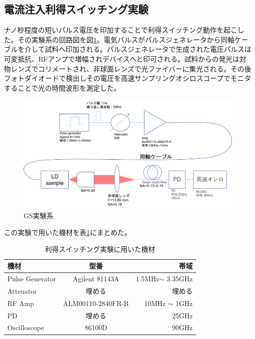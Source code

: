 \subsection{電流注入利得スイッチング実験}%
ナノ秒程度の短いパルス電圧を印加することで利得スイッチング動作を起こした。その実験系の回路図を図\ref{fig:fig_2_3_GS_setup}。電気パルスがパルスジェネレータから同軸ケーブルを介して試料へ印加される。パルスジェネレータで生成された電圧パルスは可変抵抗、RFアンプで増幅されデバイスへと印可される。試料からの発光は対物レンズでコリメートされ、非球面レンズで光ファイバーに集光される。その後フォトダイオードで検出しその電圧を高速サンプリングオシロスコープでモニタすることで光の時間波形を測定した。
\begin{figure}[htbp]
	\includegraphics[width=15cm]{figure/fig_2_3_GS_setup.png}
	\caption{GS実験系}
	\label{fig:fig_2_3_GS_setup}
\end{figure}
この実験で用いた機材を表\ref{table:table_2_2_GS_setup}にまとめた。
\begin{table}[hbtp]
  \caption{利得スイッチング実験に用いた機材}
  \label{table:table_2_2_GS_setup}
  \centering
  \begin{tabular}{lcr}
    \hline
    機材  & 型番   & 帯域  \\
    \hline \hline
    Pulse Generator  & Agilent 81143A & 1.5MHz$\sim$ 3.35GHz   \\
    Atteuator  &  埋める    & 埋める\\
    RF Amp & ALM00110-2840FR-R & 10MHz $\sim$ 1GHz \\
    PD & 埋める　& 25GHz \\
    Oscilloscope  &  86100D & 90GHz  \\
       \hline
  \end{tabular}
\end{table}
